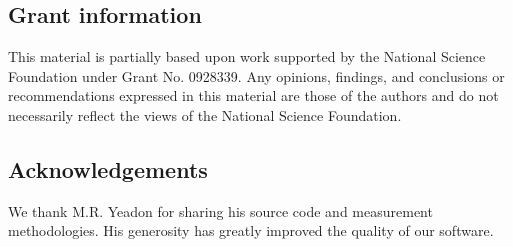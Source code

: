 \documentclass[10pt,a4paper,twocolumn]{article}
\begin{document}
\subsection*{Grant information}
This material is partially based upon work supported by the National Science
Foundation under Grant No. 0928339. Any opinions, findings, and conclusions or
recommendations expressed in this material are those of the authors and do
not necessarily reflect the views of the National Science Foundation.

\subsection*{Acknowledgements}
We thank M.R. Yeadon for sharing his source code and measurement
methodologies. His generosity has greatly improved the quality of our software.

{\small
}




\end{document}
